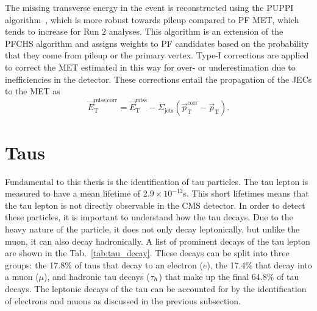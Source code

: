 The missing transverse energy in the event is reconstructed using the PUPPI algorithm~\cite{CMS-PAS-JME-18-001}, which is more robust towards pileup compared to PF MET, which tends to increase for Run 2 analyses. 
This algorithm is an extension of the PFCHS algorithm and assigns weights to PF candidates
based on the probability that they come from pileup or the primary vertex. Type-I corrections
are applied to correct the MET estimated in this way for over- or underestimation due to inefficiencies in the detector.
These corrections entail the propagation of the JECs to the MET as
\begin{equation}\label{eqn:met_t1corr} \vec{E}_{\text{T}}^{\text{miss,corr}} = \vec{E}_{\text{T}}^{\text{miss}} - \Sigma_{\text{jets}}(\vec{p}_{\text{T}}^{\text{corr}} - \vec{p}_{\text{T}}). \end{equation}


\section{Taus}

Fundamental to this thesis is the identification of tau particles.
The tau lepton is measured to have a mean lifetime of \(2.9 \times 10^{-13}\)s. 
This short lifetimes means that the tau lepton is not directly observable in the \ac{CMS} detector.  
In order to detect these particles, it is important to understand how the tau decays. 
Due to the heavy nature of the particle, it does not only decay leptonically, but unlike the muon, it can also decay hadronically.
A list of prominent decays of the tau lepton are shown in the Tab.~\ref{tab:tau_decay}.
These decays can be split into three groups: the 17.8\% of taus that decay to an electron ($e$), the 17.4\% that decay into a muon ($\mu$), and hadronic tau decays ($\tau_{h}$) that make up the final 64.8\% of tau decays. 
The leptonic decays of the tau can be accounted for by the identification of electrons and muons as discussed in the previous subsection.  \\

